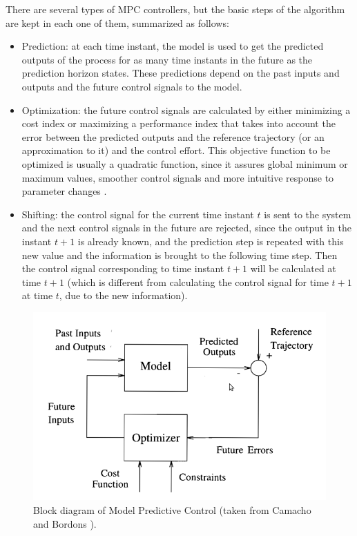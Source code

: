 There are several types of MPC controllers, but the basic steps of the algorithm are kept in each one of them, summarized as follows:

\begin{itemize}

\item Prediction: at each time instant, the model is used to get the predicted outputs of the process for as many time instants in the future as the prediction horizon states. These predictions depend on the past inputs and outputs and the future control signals to the model.

\item Optimization: the future control signals are calculated by either minimizing a cost index or maximizing a performance index that takes into account the error between the predicted outputs and the reference trajectory (or an approximation to it) and the control effort. This objective function to be optimized is usually a quadratic function, since it assures global minimum or maximum values, smoother control signals and more intuitive response to parameter changes \cite{Hovd2004}.

\item Shifting: the control signal for the current time instant $t$ is sent to the system and the next control signals in the future are rejected, since the output in the instant $t + 1$ is already known, and the prediction step is repeated with this new value and the information is brought to the following time step. Then the control signal corresponding to time instant    $t + 1$ will be calculated at time $t + 1$ (which is different from calculating the control signal for time $t + 1$ at time $t$, due to the new information).

\end{itemize}

\begin{figure}[h!]
\centering
\includegraphics[scale=0.4]{Images/Chapter2/mpc.png}
\caption{Block diagram of Model Predictive Control (taken from Camacho and Bordons \cite{CamachoBordons}).}
\label{fig:mpc_diagram}
\end{figure}

